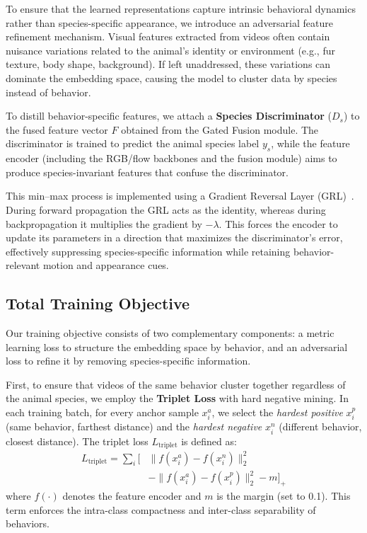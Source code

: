 \documentclass[fleqn,10pt,twocolumn]{AROB}
\begin{document}
To ensure that the learned representations capture intrinsic behavioral dynamics rather than species-specific appearance, we introduce an adversarial feature refinement mechanism. Visual features extracted from videos often contain nuisance variations related to the animal’s identity or environment (e.g., fur texture, body shape, background). If left unaddressed, these variations can dominate the embedding space, causing the model to cluster data by species instead of behavior.

To distill behavior-specific features, we attach a \textbf{Species Discriminator} ($D_s$) to the fused feature vector $F$ obtained from the Gated Fusion module. The discriminator is trained to predict the animal species label $y_s$, while the feature encoder (including the RGB/flow backbones and the fusion module) aims to produce species-invariant features that confuse the discriminator.

This min–max process is implemented using a Gradient Reversal Layer (GRL)~\cite{ganin2016domain}. During forward propagation the GRL acts as the identity, whereas during backpropagation it multiplies the gradient by $-\lambda$. This forces the encoder to update its parameters in a direction that maximizes the discriminator’s error, effectively suppressing species-specific information while retaining behavior-relevant motion and appearance cues.

\subsection{Total Training Objective}

Our training objective consists of two complementary components: a metric learning loss to structure the embedding space by behavior, and an adversarial loss to refine it by removing species-specific information.

First, to ensure that videos of the same behavior cluster together regardless of the animal species, we employ the \textbf{Triplet Loss} with hard negative mining.
In each training batch, for every anchor sample $x_i^a$, we select the \textit{hardest positive} $x_i^p$ (same behavior, farthest distance) and the \textit{hardest negative} $x_i^n$ (different behavior, closest distance).
The triplet loss $L_{\text{triplet}}$ is defined as:
%
\begin{align}
L_{\text{triplet}} = \sum_i \Big[ &
\| f(x_i^a) - f(x_i^n) \|_2^2 \nonumber\\
& - \| f(x_i^a) - f(x_i^p) \|_2^2
 - m \Big]_+
\end{align}
%
where $f(\cdot)$ denotes the feature encoder and $m$ is the margin (set to 0.1). This term enforces the intra-class compactness and inter-class separability of behaviors.
\end{document}
